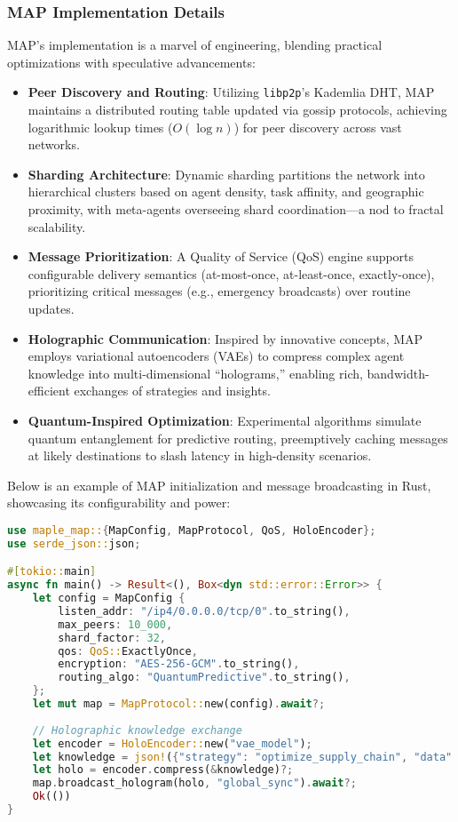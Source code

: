 \documentclass[a4paper,11pt]{article}
\begin{document}
\subsubsection{MAP Implementation Details}
MAP’s implementation is a marvel of engineering, blending practical optimizations with speculative advancements:
\begin{itemize}[leftmargin=*]
    \item \textbf{Peer Discovery and Routing}: Utilizing \texttt{libp2p}’s Kademlia DHT, MAP maintains a distributed routing table updated via gossip protocols, achieving logarithmic lookup times ($O(\log n)$) for peer discovery across vast networks.
    \item \textbf{Sharding Architecture}: Dynamic sharding partitions the network into hierarchical clusters based on agent density, task affinity, and geographic proximity, with meta-agents overseeing shard coordination—a nod to fractal scalability.
    \item \textbf{Message Prioritization}: A Quality of Service (QoS) engine supports configurable delivery semantics (at-most-once, at-least-once, exactly-once), prioritizing critical messages (e.g., emergency broadcasts) over routine updates.
    \item \textbf{Holographic Communication}: Inspired by innovative concepts, MAP employs variational autoencoders (VAEs) to compress complex agent knowledge into multi-dimensional “holograms,” enabling rich, bandwidth-efficient exchanges of strategies and insights.
    \item \textbf{Quantum-Inspired Optimization}: Experimental algorithms simulate quantum entanglement for predictive routing, preemptively caching messages at likely destinations to slash latency in high-density scenarios.
\end{itemize}

Below is an example of MAP initialization and message broadcasting in Rust, showcasing its configurability and power:
\begin{lstlisting}[language=Rust, caption={Rust MAP Example}, label={lst:map-init}]
use maple_map::{MapConfig, MapProtocol, QoS, HoloEncoder};
use serde_json::json;

#[tokio::main]
async fn main() -> Result<(), Box<dyn std::error::Error>> {
    let config = MapConfig {
        listen_addr: "/ip4/0.0.0.0/tcp/0".to_string(),
        max_peers: 10_000,
        shard_factor: 32,
        qos: QoS::ExactlyOnce,
        encryption: "AES-256-GCM".to_string(),
        routing_algo: "QuantumPredictive".to_string(),
    };
    let mut map = MapProtocol::new(config).await?;
    
    // Holographic knowledge exchange
    let encoder = HoloEncoder::new("vae_model");
    let knowledge = json!({"strategy": "optimize_supply_chain", "data": [1, 2, 3]});
    let holo = encoder.compress(&knowledge)?;
    map.broadcast_hologram(holo, "global_sync").await?;
    Ok(())
}
\end{lstlisting}
\vspace{0.5cm}
\end{document}
